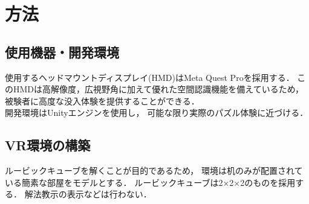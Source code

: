 \newpage
\section{方法}
  \subsection{使用機器・開発環境}
    使用するヘッドマウントディスプレイ(HMD)はMeta Quest Proを採用する．
    このHMDは高解像度，広視野角に加えて優れた空間認識機能を備えているため，
    被験者に高度な没入体験を提供することができる．
    \\\indent
    開発環境はUnityエンジンを使用し，
    可能な限り実際のパズル体験に近づける．
    \\\indent

  \subsection{VR環境の構築}
    ルービックキューブを解くことが目的であるため，
    環境は机のみが配置されている簡素な部屋をモデルとする．
    ルービックキューブは2×2×2のものを採用する．
    解法教示の表示などは行わない．
    

